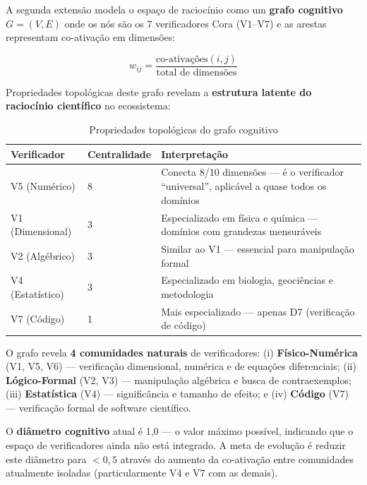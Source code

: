 A segunda extensão modela o espaço de raciocínio como um \textbf{grafo
cognitivo} $G = (V, E)$ onde os nós são os 7 verificadores Cora (V1--V7) e
as arestas representam co-ativação em dimensões:

\begin{equation}\label{eq:graph}
w_{ij} = \frac{\text{co-ativações}(i,j)}{\text{total de dimensões}}
\end{equation}

Propriedades topológicas deste grafo revelam a \textbf{estrutura latente do
raciocínio científico} no ecossistema:

\begin{table}[H]\centering
\caption{Propriedades topológicas do grafo cognitivo}
\label{tab:graph_props}
\begin{tabular}{p{}p{}p{}}
\toprule
\textbf{Verificador} & \textbf{Centralidade} & \textbf{Interpretação} \\
\midrule
V5 (Numérico) & 8 & Conecta 8/10 dimensões — é o verificador ``universal'', aplicável a quase todos os domínios \\
V1 (Dimensional) & 3 & Especializado em física e química — domínios com grandezas mensuráveis \\
V2 (Algébrico) & 3 & Similar ao V1 — essencial para manipulação formal \\
V4 (Estatístico) & 3 & Especializado em biologia, geociências e metodologia \\
V7 (Código) & 1 & Mais especializado — apenas D7 (verificação de código) \\
\bottomrule
\end{tabular}
\end{table}

O grafo revela \textbf{4 comunidades naturais} de verificadores: (i)
\textbf{Físico-Numérica} (V1, V5, V6) — verificação dimensional, numérica e
de equações diferenciais; (ii) \textbf{Lógico-Formal} (V2, V3) — manipulação
algébrica e busca de contraexemplos; (iii) \textbf{Estatística} (V4) —
significância e tamanho de efeito; e (iv) \textbf{Código} (V7) — verificação
formal de software científico.

O \textbf{diâmetro cognitivo} atual é 1,0 — o valor máximo possível, indicando
que o espaço de verificadores ainda não está integrado. A meta de evolução é
reduzir este diâmetro para $< 0,5$ através do aumento da co-ativação entre
comunidades atualmente isoladas (particularmente V4 e V7 com as demais).

